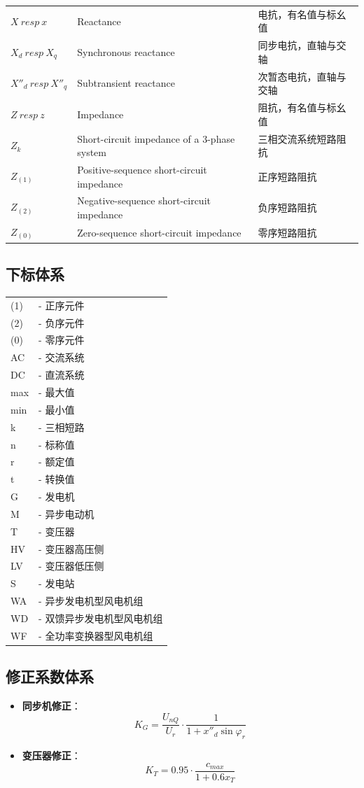 \documentclass[a4paper,11pt,AutoFakeBold]{ctexart}
\begin{document}
\begin{tabular}{lll}
$X \ resp \ x$ & Reactance & 电抗，有名值与标幺值 \\
$X_d \ resp \ X_q$ & Synchronous reactance & 同步电抗，直轴与交轴 \\
$X''_d \ resp \ X''_q$ & Subtransient reactance & 次暂态电抗，直轴与交轴 \\
$Z \ resp \ z$ & Impedance & 阻抗，有名值与标幺值 \\
$Z_k$ & Short-circuit impedance of a 3-phase system & 三相交流系统短路阻抗 \\
$Z_{(1)}$ & Positive-sequence short-circuit impedance & 正序短路阻抗 \\
$Z_{(2)}$ & Negative-sequence short-circuit impedance & 负序短路阻抗 \\
$Z_{(0)}$ & Zero-sequence short-circuit impedance & 零序短路阻抗 

\end{tabular}

\subsection{下标体系}
\begin{tabular}{ll}
(1)  & - 正序元件 \\
(2)  & - 负序元件 \\
(0)  & - 零序元件 \\
AC   & - 交流系统 \\
DC   & - 直流系统 \\
max  & - 最大值 \\
min  & - 最小值 \\
k    & - 三相短路 \\
n    & - 标称值 \\
r    & - 额定值 \\
t    & - 转换值 \\
G    & - 发电机 \\
M    & - 异步电动机 \\
T    & - 变压器 \\
HV   & - 变压器高压侧 \\
LV   & - 变压器低压侧 \\
S    & - 发电站 \\
WA   & - 异步发电机型风电机组 \\
WD   & - 双馈异步发电机型风电机组 \\
WF   & - 全功率变换器型风电机组 \\
\end{tabular}

\subsection{修正系数体系}
\begin{itemize}
\item \textbf{同步机修正}：
  \[
  K_G = \frac{U_{nQ}}{U_r} \cdot \frac{1}{1 + x''_d \sin\varphi_r} 
  \]
  
\item \textbf{变压器修正}：
  \[
  K_T = 0.95 \cdot \frac{c_{max}}{1 + 0.6x_T}
  \]
\end{itemize}
\end{document}
